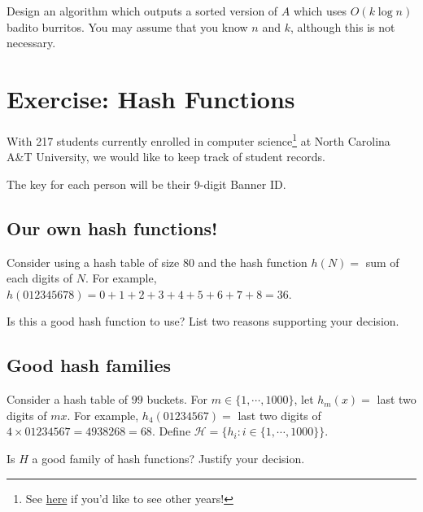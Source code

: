 \documentclass [12pt]{article}
\newcommand {\hint }[1]{\noindent {[\textbf {HINT:} \em #1 \em ]}} \newcommand {\pts }[1]{\textbf {(#1 pt.)}}
\begin{document}
Design an algorithm which outputs a sorted version of $A$ which uses $O(k\log n)$ badito burritos. You may assume that you know $n$ and $k$, although this is not necessary. 


\hint{One approach is to think first about what you would do for $k=2$: that is, when $A$ contains only the numbers $1$ and $2$. What information do you need to write down a sorted version of $A$ in this case?} 
 

\pagebreak
\section{Exercise: Hash Functions }
With 217 students currently enrolled in computer science\footnote{See \href{https://www.ncat.edu/coe/departments/cs/undergrad-programs/index.php}{here} if you'd like to see other years!} at North Carolina A\&T University, we would like to keep track of student records. 

The key for each person will be their 9-digit Banner ID.

\subsection{Our own hash functions! }
Consider using a hash table of size $80$ and the hash function $h(N) =$ sum of each digits of $N$. For example, $h(012345678) = 0 + 1 + 2 + 3 + 4 + 5 + 6 + 7 + 8 = 36$. 

Is this a good hash function to use? List two reasons supporting your decision.


\subsection{Good hash families }
Consider a hash table of $99$ buckets. For $m \in \{1, \cdots , 1000\}$, let $h_m(x) =$ last two digits of $mx$.  For example, $h_4(01234567)=$ last two digits of $4\times01234567=4938268 = 68$. Define $\mathcal{H} = \{h_i: i \in \{1, \cdots, 1000\}\}$. 

Is $H$ a good family of hash functions? Justify your decision.
\end{document}
